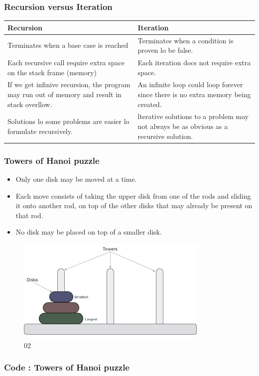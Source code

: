 \documentclass{beamer}
\begin{document}
\begin{frame}
\frametitle{Recursion versus Iteration}
\begin{tabular}{|L{5cm}|L{5cm}|}
\hline
\textbf{Recursion} & \textbf{Iteration}  \\
\hline
Terminates when a base case is reached 
& Terminates when a condition is proven lo be false. \\
\hline
Each recursive call require extra space on the stack frame (memory) 
& Each iteration docs not require extra space.  \\
\hline
If we get infinive recursion, the program may run out of memory 
and result in stack overllow.
& An infinite loop could loop forever since there is no extra memory being created.  \\
\hline
Solutions lo some problems are easier lo formulate recursively.
& lterative solutions to a problem may not always be as obvious as a recursive solution. \\
\hline
\end{tabular}
\end{frame}


\begin{frame}
\frametitle{Towers of Hanoi puzzle}
\begin{itemize}
\item Only one disk may be moved at a time.
\item Each move consists of taking the upper disk from one of the rods and sliding it onto another rod, on top
of the other disks that may already be present on that rod.
\item No disk may be placed on top of a smaller disk.
\end{itemize}
\begin{figure}
\includegraphics[scale=0.5]{img/ch01_tower_of_hanoi.jpg}
\caption{02}
\end{figure}
\end{frame}

\begin{frame}
\frametitle{Code : Towers of Hanoi puzzle}

\end{frame}
\end{document}
